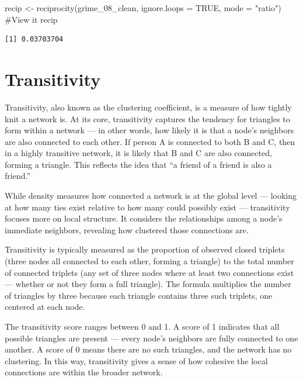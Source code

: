 \documentclass[
  letterpaper,
  DIV=11,
  numbers=noendperiod]{scrreprt}
\newenvironment{Shaded}{\begin{snugshade}}{\end{snugshade}}
\newcommand{\AttributeTok}[1]{\textcolor[rgb]{0.40,0.45,0.13}{#1}}
\newcommand{\CommentTok}[1]{\textcolor[rgb]{0.37,0.37,0.37}{#1}}
\newcommand{\ConstantTok}[1]{\textcolor[rgb]{0.56,0.35,0.01}{#1}}
\newcommand{\FunctionTok}[1]{\textcolor[rgb]{0.28,0.35,0.67}{#1}}
\newcommand{\NormalTok}[1]{\textcolor[rgb]{0.00,0.23,0.31}{#1}}
\newcommand{\OtherTok}[1]{\textcolor[rgb]{0.00,0.23,0.31}{#1}}
\newcommand{\StringTok}[1]{\textcolor[rgb]{0.13,0.47,0.30}{#1}}
\begin{document}
\begin{Shaded}
\begin{Highlighting}[]
\NormalTok{recip }\OtherTok{\textless{}{-}} \FunctionTok{reciprocity}\NormalTok{(grime\_08\_clean, }\AttributeTok{ignore.loops =} \ConstantTok{TRUE}\NormalTok{, }\AttributeTok{mode =} \StringTok{"ratio"}\NormalTok{)}
\CommentTok{\#View it}
\NormalTok{recip}
\end{Highlighting}
\end{Shaded}

\begin{verbatim}
[1] 0.03703704
\end{verbatim}

\section{Transitivity}\label{transitivity}

Transitivity, also known as the clustering coefficient, is a measure of
how tightly knit a network is. At its core, transitivity captures the
tendency for triangles to form within a network --- in other words, how
likely it is that a node's neighbors are also connected to each other.
If person A is connected to both B and C, then in a highly transitive
network, it is likely that B and C are also connected, forming a
triangle. This reflects the idea that ``a friend of a friend is also a
friend.''

While density measures how connected a network is at the global level
--- looking at how many ties exist relative to how many could possibly
exist --- transitivity focuses more on local structure. It considers the
relationships among a node's immediate neighbors, revealing how
clustered those connections are.

Transitivity is typically measured as the proportion of observed closed
triplets (three nodes all connected to each other, forming a triangle)
to the total number of connected triplets (any set of three nodes where
at least two connections exist --- whether or not they form a full
triangle). The formula multiplies the number of triangles by three
because each triangle contains three such triplets, one centered at each
node.

The transitivity score ranges between 0 and 1. A score of 1 indicates
that all possible triangles are present --- every node's neighbors are
fully connected to one another. A score of 0 means there are no such
triangles, and the network has no clustering. In this way, transitivity
gives a sense of how cohesive the local connections are within the
broader network.
\end{document}
